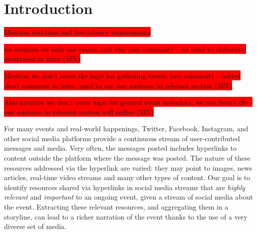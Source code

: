 \documentclass{sig-alternate}
\newcommand{\todo}[1]{\colorbox{red}{#1}}
\begin{document}


\section{Introduction}
\label{sec:introduction}

\todo{Mention real-time and low-latency requirements}

\todo{we mention we only use tweets and why (see comment) -- no need to elaborate; mentioned in intro (MN)}

\todo{Mention we don't cover the logic for gathering tweets (see comment) -- added short comment to intro, need to say one sentence in relevant section (MN)}

\todo{Also mention we don't cover logic for general event metadata, we use Seen's db -- one sentence in relevant section will suffice (MN)}


For many events and real-world happenings, Twitter, Facebook, Instagram, and other social media platforms provide a continuous stream of user-contributed messages and media. Very often, the messages posted includes hyperlinks to content outside the platform where the message was posted. The nature of these resources addressed via the hyperlink are varied: they may point to images, news articles, real-time video streams and many other types of content. Our goal is to identify resources shared via hyperlinks in social media streams that are \emph{highly relevant} and \emph{important} to an ongoing event, given a stream of social media about the event. Extracting these relevant resources, and aggregating them in a storyline, can lead to a richer narration of the event thanks to the use of a very diverse set of media.
\end{document}
